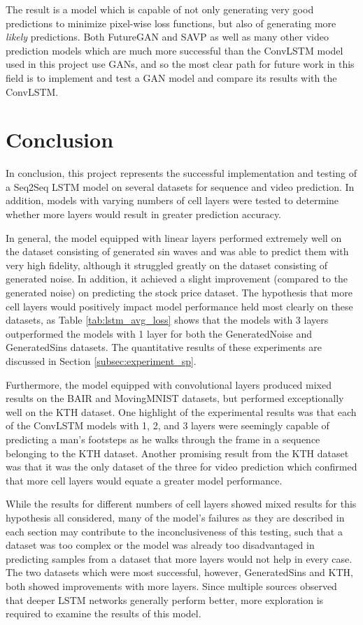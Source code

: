 \documentclass{scrartcl}
\begin{document}
The result is a model which is capable of not only generating very good
predictions to minimize pixel-wise loss functions, but also of generating more
\textit{likely} predictions. Both FutureGAN \cite{futuregan} and SAVP
\cite{savp} as well as many other video prediction models which are much more
successful than the ConvLSTM model used in this project use GANs, and so the
most clear path for future work in this field is to implement and test a GAN
model and compare its results with the ConvLSTM.

\section{Conclusion}
\label{sec:conclusion}

In conclusion, this project represents the successful implementation and
testing of a Seq2Seq LSTM model on several datasets for sequence and video
prediction. In addition, models with varying numbers of cell layers were tested
to determine whether more layers would result in greater prediction accuracy.

In general, the model equipped with linear layers performed extremely well on
the dataset consisting of generated sin waves and was able to predict them with
very high fidelity, although it struggled greatly on the dataset consisting of
generated noise. In addition, it achieved a slight improvement (compared to the
generated noise) on predicting the stock price dataset. The hypothesis that
more cell layers would positively impact model performance held most clearly on
these datasets, as Table \ref{tab:lstm_avg_loss} shows that the models with 3
layers outperformed the models with 1 layer for both the GeneratedNoise and
GeneratedSins datasets. The quantitative results of these experiments are
discussed in Section \ref{subsec:experiment_sp}.

Furthermore, the model equipped with convolutional layers produced mixed
results on the BAIR and MovingMNIST datasets, but performed exceptionally well
on the KTH dataset. One highlight of the experimental results was that each of
the ConvLSTM models with 1, 2, and 3 layers were seemingly capable of
predicting a man's footsteps as he walks through the frame in a sequence
belonging to the KTH dataset. Another promising result from the KTH dataset was
that it was the only dataset of the three for video prediction which confirmed
that more cell layers would equate a greater model performance.

While the results for different numbers of cell layers showed mixed results for
this hypothesis all considered, many of the model's failures as they are
described in each section may contribute to the inconclusiveness of this
testing, such that a dataset was too complex or the model was already too
disadvantaged in predicting samples from a dataset that more layers would not
help in every case. The two datasets which were most successful, however,
GeneratedSins and KTH, both showed improvements with more layers. Since
multiple sources \cite{mmnist_dataset, seq2seq_original} observed that deeper
LSTM networks generally perform better, more exploration is required to examine
the results of this model.
\end{document}
